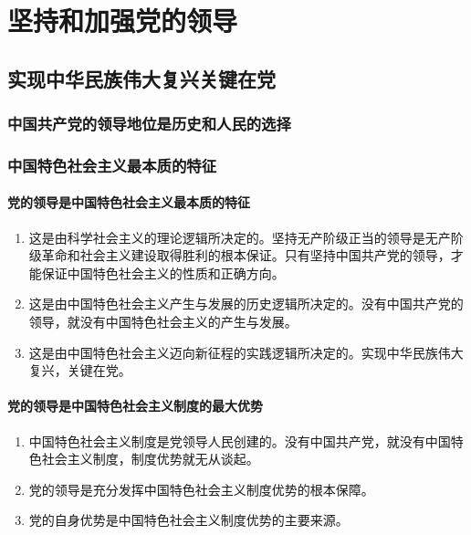 \chapter{坚持和加强党的领导}

\section{实现中华民族伟大复兴关键在党}
    \subsection{中国共产党的领导地位是历史和人民的选择}

    \subsection{中国特色社会主义最本质的特征}
        \subsubsection{党的领导是中国特色社会主义最本质的特征}
        \begin{enumerate}
            \item 这是由科学社会主义的理论逻辑所决定的。坚持无产阶级正当的领导是无产阶级革命和社会主义建设取得胜利的根本保证。只有坚持中国共产党的领导，才能保证中国特色社会主义的性质和正确方向。
            \item 这是由中国特色社会主义产生与发展的历史逻辑所决定的。没有中国共产党的领导，就没有中国特色社会主义的产生与发展。
            \item 这是由中国特色社会主义迈向新征程的实践逻辑所决定的。实现中华民族伟大复兴，关键在党。
        \end{enumerate}

        \subsubsection{党的领导是中国特色社会主义制度的最大优势}
        \begin{enumerate}
            \item 中国特色社会主义制度是党领导人民创建的。没有中国共产党，就没有中国特色社会主义制度，制度优势就无从谈起。
            \item 党的领导是充分发挥中国特色社会主义制度优势的根本保障。
            \item 党的自身优势是中国特色社会主义制度优势的主要来源。
        \end{enumerate}

